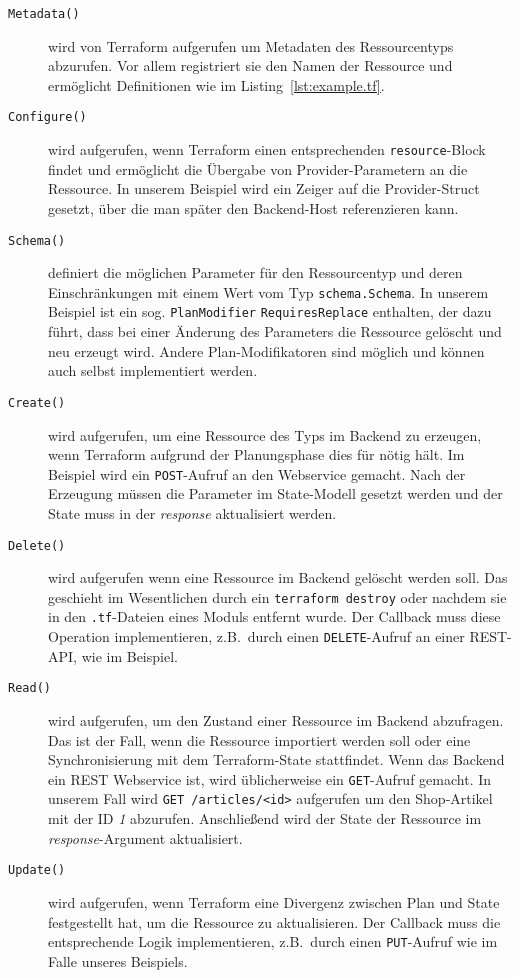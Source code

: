 \documentclass[paper=a4,11pt,numbers=noenddot]{article}
\begin{document}
\begin{description}
\item[\texttt{Metadata()}] wird von Terraform aufgerufen um Metadaten des Ressourcentyps abzurufen. Vor allem registriert sie den Namen der Ressource und ermöglicht Definitionen wie im Listing~\ref{lst:example.tf}.
\item[\texttt{Configure()}] wird aufgerufen, wenn Terraform einen entsprechenden \verb'resource'-Block findet und ermöglicht die Übergabe von Provider-Parametern an die Ressource. In unserem Beispiel wird ein Zeiger auf die Provider-Struct gesetzt, über die man später den Backend-Host referenzieren kann.
\item[\texttt{Schema()}] definiert die möglichen Parameter für den Ressourcentyp und deren Einschränkungen mit einem Wert vom Typ \verb'schema.Schema'. In unserem Beispiel ist ein sog. \verb'PlanModifier' \verb'RequiresReplace' enthalten, der dazu führt, dass bei einer Änderung des Parameters die Ressource gelöscht und neu erzeugt wird. Andere Plan-Modifikatoren sind möglich und können auch selbst implementiert werden.
\item[\texttt{Create()}] wird aufgerufen, um eine Ressource des Typs im Backend zu erzeugen, wenn Terraform aufgrund der Planungsphase dies für nötig hält. Im Beispiel wird ein \verb'POST'-Aufruf an den Webservice gemacht. Nach der Erzeugung müssen die Parameter im State-Modell gesetzt werden und der State muss in der \emph{response} aktualisiert werden.
\item[\texttt{Delete()}] wird aufgerufen wenn eine Ressource im Backend gelöscht werden soll. Das geschieht im Wesentlichen durch ein \verb'terraform destroy' oder nachdem sie in den \verb'.tf'-Dateien eines Moduls entfernt wurde. Der Callback muss diese Operation implementieren, z.B.\ durch einen \verb'DELETE'-Aufruf an einer REST-API, wie im Beispiel.
\item[\texttt{Read()}] wird aufgerufen, um den Zustand einer Ressource im Backend abzufragen. Das ist der Fall, wenn die Ressource importiert werden soll oder eine Synchronisierung mit dem Terraform-State stattfindet. Wenn das Backend ein REST Webservice ist, wird üblicherweise ein \verb'GET'-Aufruf gemacht. In unserem Fall wird \verb'GET /articles/<id>' aufgerufen um den Shop-Artikel mit der ID \emph{1} abzurufen. Anschließend wird der State der Ressource im \emph{response}-Argument aktualisiert.
\item[\texttt{Update()}] wird aufgerufen, wenn Terraform eine Divergenz zwischen Plan und State festgestellt hat, um die Ressource zu aktualisieren. Der Callback muss die entsprechende Logik implementieren, z.B.\ durch einen \verb'PUT'-Aufruf wie im Falle unseres Beispiels.
\end{description}
\end{document}
